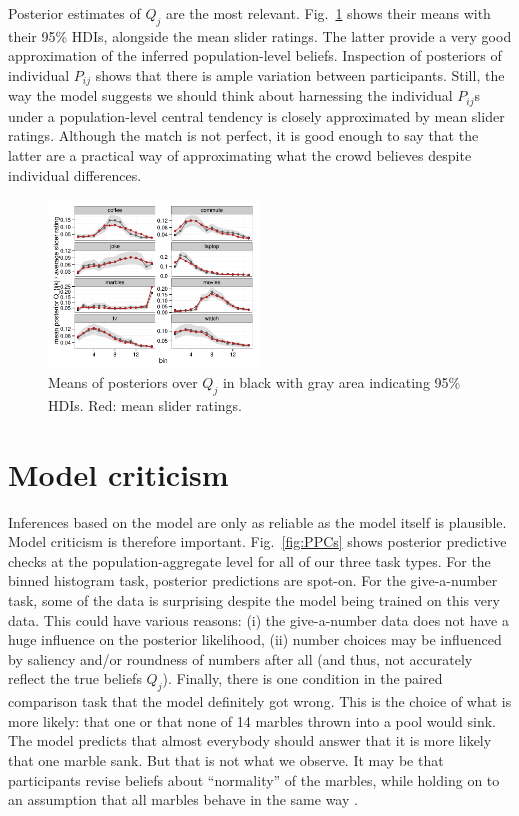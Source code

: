 \documentclass[10pt,letterpaper]{article}
\newcommand{\figref}[1]{Fig.~\ref{#1}}
\begin{document}
Posterior estimates of $Q_j$ are the most relevant. \figref{fig:PosteriorQj} shows their means
with their 95\% HDIs, alongside the mean slider ratings. The latter provide a very good
approximation of the inferred population-level beliefs. Inspection of posteriors of
individual $P_{ij}$ shows that there is ample variation between participants. Still, the
way the model suggests we should think about harnessing the individual $P_{ij}$s under a
population-level central tendency is closely approximated by mean slider ratings. Although the
match is not perfect, it is good enough to say that the latter are a practical way of
approximating what the crowd believes despite individual differences.

\begin{figure}
  \centering
  \includegraphics[width = 0.5\textwidth]{plots/pop_priors.pdf}
  \caption{Means of posteriors over $Q_j$ in black with gray area indicating 95\% HDIs. Red: mean slider ratings.}
  \label{fig:PosteriorQj}
\end{figure}

\section{Model criticism}

Inferences based on the model are only as reliable as the model itself is plausible. Model
criticism is therefore important. \figref{fig:PPCs} shows posterior predictive checks at the
population-aggregate level for all of our three task types. For the binned histogram task,
posterior predictions are spot-on. For the give-a-number task, some of the data is surprising
despite the model being trained on this very data. This could have various reasons: (i) the
give-a-number data does not have a huge influence on the posterior likelihood, (ii) number
choices may be influenced by saliency and/or roundness of numbers after all (and thus, not
accurately reflect the true beliefs $Q_j$). Finally, there is one condition in the paired
comparison task that the model definitely got wrong. This is the choice of what is more likely:
that one or that none of 14 marbles thrown into a pool would sink. The model predicts that
almost everybody should answer that it is more likely that one marble sank. But that is not
what we observe. It may be that participants revise beliefs about ``normality'' of the marbles,
while holding on to an assumption that all marbles behave in the same way
\cite{DegenTessler2015:Wonky-worlds:-L}.
\end{document}
